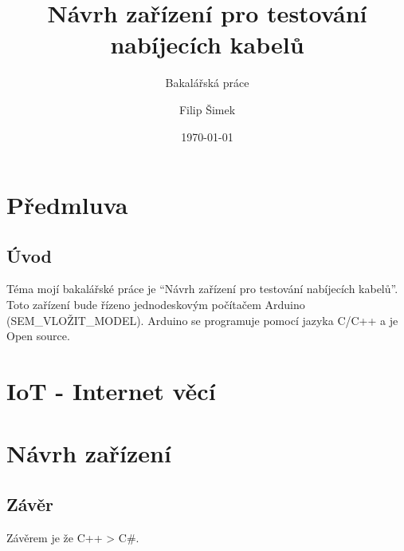 \documentclass[12pt,a4paper,titlepage]{scrreprt}
\title{\vspace{6cm}Návrh zařízení pro testování nabíjecích kabelů}
\subtitle{Bakalářská práce}
\author{Filip Šimek}
\date{\today}
\begin{document}
	\maketitle 

	\tableofcontents
	\newpage
	
	
	
	
	\chapter{Předmluva}
	\section {Úvod}
	Téma mojí bakalářské práce je “Návrh zařízení pro testování nabíjecích kabelů”. Toto zařízení bude řízeno jednodeskovým počítačem Arduino (SEM\_VLOŽIT\_MODEL). Arduino se programuje pomocí jazyka C/C++ a je Open source.
	
	\chapter{IoT - Internet věcí}
	
	
	\chapter{Návrh zařízení}
	
	
	
	
	 \section*{Závěr}
	Závěrem je že C++ > C\#.
\end{document}
